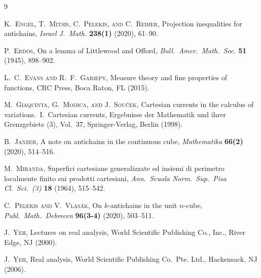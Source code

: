 \documentclass{publicadapt}
\begin{document}
\begin{thebibliography}{9}

 \textsc{K.\ Engel, T.\ Mitsis, C.\ Pelekis, and C.\ Reiher}, 
 Projection inequalities for antichains, 
 \emph{Israel J.\ Math.} {\bf 238(1)} (2020), 61--90. 

 \textsc{P.\ Erd\"os}, 
 On a lemma of {L}ittlewood and {O}fford, 
 \emph{Bull.\ Amer.\ Math.\ Soc.} {\bf 51} (1945), 898--902. 

 \textsc{L.\ C.\ Evans and R.\ F.\ Gariepy}, 
 Measure theory and fine properties of functions, 
 CRC Press, Boca Raton, FL (2015). 

 \textsc{M.\ Giaquinta, G.\ Modica, and J.\ Sou\v{c}ek},
 Cartesian currents in the calculus of variations.\ I.\ Cartesian currents,
 Ergebnisse der Mathematik und ihrer Grenzgebiete (3), Vol.~37,
 Springer-Verlag, Berlin (1998).

 \textsc{B.\ Janzer}, 
 A note on antichains in the continuous cube, 
 \emph{Mathematika} {\bf 66(2)} (2020), 514--516. 

 \textsc{M.\ Miranda}, 
 Superfici cartesiane generalizzate ed insiemi di perimetro localmente finito sui prodotti cartesiani, 
 \emph{Ann.\ Scuola Norm.\ Sup.\ Pisa Cl.\ Sci.\ (3)} {\bf 18} (1964), 515--542. 

 \textsc{C.\ Pelekis and V.\ Vlas\'ak}, 
 On {$k$}-antichains in the unit {$n$}-cube, 
 \emph{Publ.\ Math.\ Debrecen} {\bf 96(3-4)} (2020), 503--511. 

 \textsc{J.\ Yeh}, 
 Lectures on real analysis, 
 World Scientific Publishing Co., Inc., River Edge, NJ (2000). 

 \textsc{J.\ Yeh}, 
 Real analysis, 
 World Scientific Publishing Co.\ Pte. Ltd., Hackensack, NJ (2006). 

\end{thebibliography}
\end{document}
